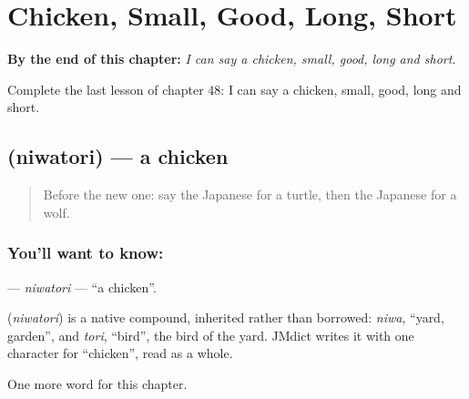
\chapter{Chicken, Small, Good, Long, Short}
\label{ch:ja-chicken-small-good-long-short}

\begin{chapteropening}
\textbf{By the end of this chapter:} \emph{I can say a chicken, small, good, long and short.}

Complete the last lesson of chapter 48: I can say a chicken, small, good, long and short.
\end{chapteropening}

\section[\texorpdfstring{\ja{にわとり} (niwatori)}{にわとり (niwatori)}]{ (niwatori) — a chicken}

\label{lesson:JA-C48-niwatori}



\begin{quote}
Before the new one: say the Japanese for a turtle, then the Japanese for a wolf.
\end{quote}

\subsection*{You'll want to know: }
\textbf{} — \emph{niwatori} — \textquotedblleft{}a chicken\textquotedblright{}.

\begin{cousinweb}
\textbf{} (\emph{niwatori}) is a native compound, inherited rather than borrowed: \emph{niwa}, \textquotedblleft{}yard, garden\textquotedblright{}, and \emph{tori}, \textquotedblleft{}bird\textquotedblright{}, the bird of the yard. JMdict writes it with one character for \textquotedblleft{}chicken\textquotedblright{}, read as a whole.
\end{cousinweb}

\begin{grammarlens}[title={What you've built}]
One more word for this chapter.
\end{grammarlens}

